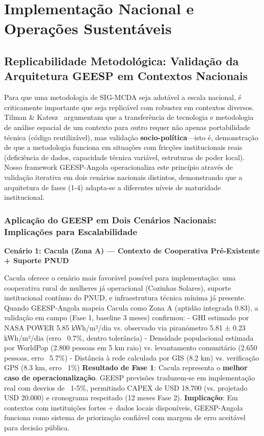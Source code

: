 \documentclass[12pt, a4paper]{article}
\begin{document}
\clearpage
\section{Implementação Nacional e Operações Sustentáveis}

\subsection{Replicabilidade Metodológica: Validação da Arquitetura GEESP em Contextos Nacionais}

Para que uma metodologia de SIG-MCDA seja adotável a escala nacional, é criticamente importante que seja replicável com robustez em contextos diversos. Tilman \& Katesz~\citep{Tilman2002} argumentam que a transferência de tecnologia e metodologia de análise espacial de um contexto para outro requer não apenas portabilidade técnica (código reutilizável), mas validação \textbf{socio-política}---isto é, demonstração de que a metodologia funciona em situações com fricções institucionais reais (deficiência de dados, capacidade técnica variável, estruturas de poder local). Nosso framework GEESP-Angola operacionaliza este princípio através de validação iterativa em dois cenários nacionais distintos, demonstrando que a arquitetura de fases (1-4) adapta-se a diferentes níveis de maturidade institucional.

\subsubsection{Aplicação do GEESP em Dois Cenários Nacionais: Implicações para Escalabilidade}

\textbf{Cenário 1: Cacula (Zona A) — Contexto de Cooperativa Pré-Existente + Suporte PNUD}

Cacula oferece o cenário mais favorável possível para implementação: uma cooperativa rural de mulheres já operacional (Cozinhas Solares), suporte institucional contínuo do PNUD, e infraestrutura técnica mínima já presente. Quando GEESP-Angola mapeia Cacula como Zona A (aptidão integrada 0.83), a validação em campo (Fase 1, baseline 3 meses) confirmou:
- GHI estimado por NASA POWER 5.85 kWh/m²/dia vs. observado via piranómetro 5.81 ± 0.23 kWh/m²/dia (erro ~0.7\%, dentro tolerância)
- Densidade populacional estimada por WorldPop (2.800 pessoas em 5 km raio) vs. levantamento comunitário (2.650 pessoas, erro ~5.7\%)
- Distância à rede calculada por GIS (8.2 km) vs. verificação GPS (8.3 km, erro ~1\%)
\textbf{Resultado de Fase 1}: Cacula representa o 
\textbf{melhor caso de operacionalização}. GEESP previsões traduzem-se em implementação real com desvios de ~1-5\%, permitindo CAPEX de USD 18.700 (vs. projetado USD 20.000) e cronograma respeitado (12 meses Fase 2).
\textbf{Implicação}: Em contextos com instituições fortes + dados locais disponíveis, GEESP-Angola funciona como sistema de priorização confiável com margem de erro aceitável para decisão pública.
\end{document}
